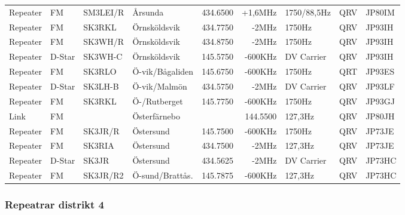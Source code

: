 \begin{longtable}{llllrrlcl}
Repeater & FM     & SM3LEI/R & Årsunda          & 434.6500  & +1,6MHz  & 1750/88,5Hz   & QRV & JP80IM \\
Repeater & FM     & SK3RKL   & Örnsköldsvik     & 434.7750  & -2MHz    & 1750Hz        & QRV & JP93IH \\
Repeater & FM     & SK3WH/R  & Örnsköldsvik     & 434.8750  & -2MHz    & 1750Hz        & QRV & JP93IH \\
Repeater & D-Star & SK3WH-C  & Örnsköldsvik     & 145.5750  & -600KHz  & DV Carrier    & QRV & JP93IH \\
Repeater & FM     & SK3RLO   & Ö-vik/Bågaliden  & 145.6750  & -600KHz  & 1750Hz        & QRT & JP93ES \\
Repeater & D-Star & SK3LH-B  & Ö-vik/Malmön     & 434.5750  & -2MHz    & DV Carrier    & QRV & JP93LF \\
Repeater & FM     & SK3RKL   & Ö-/Rutberget     & 145.7750  & -600KHz  & 1750Hz        & QRV & JP93GJ \\
Link     & FM     &          & Österfärnebo     &           & 144.5500 & 127,3Hz       & QRV & JP80JH \\
Repeater & FM     & SK3JR/R  & Östersund        & 145.7500  & -600KHz  & 1750Hz        & QRV & JP73JE \\
Repeater & FM     & SK3RIA   & Östersund        & 434.7500  & -2MHz    & 127,3Hz       & QRV & JP73JE \\
Repeater & D-Star & SK3JR    & Östersund        & 434.5625  & -2MHz    & DV Carrier    & QRV & JP73HC \\
Repeater & FM     & SK3JR/R2 & Ö-sund/Brattås.  & 145.7875  & -600KHz  & 127,3Hz       & QRV & JP73HC

\end{longtable}

\subsubsection{Repeatrar distrikt 4}

